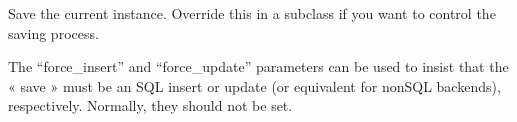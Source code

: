 \documentclass[letterpaper,10pt,french]{sphinxmanual}
\begin{document}
\begin{fulllineitems}
\begin{fulllineitems}
\end{fulllineitems}


\begin{fulllineitems}
\label{\detokenize{main/model:main.models.Information.objects}}
\pysigstartsignatures
{}
\pysigstopsignatures
\end{fulllineitems}


\begin{fulllineitems}
\label{\detokenize{main/model:main.models.Information.save}}
\pysigstartsignatures
{}
\pysigstopsignatures
\sphinxAtStartPar
Save the current instance. Override this in a subclass if you want to
control the saving process.

\sphinxAtStartPar
The “force\_insert” and “force\_update” parameters can be used to insist
that the « save » must be an SQL insert or update (or equivalent for
non\sphinxhyphen{}SQL backends), respectively. Normally, they should not be set.

\end{fulllineitems}


\end{fulllineitems}

\end{document}
